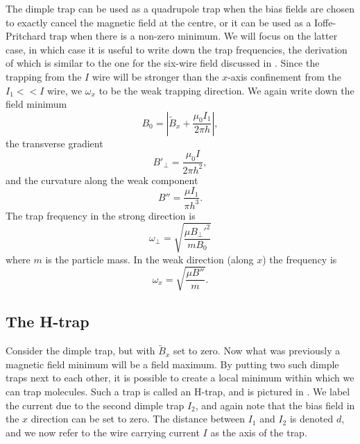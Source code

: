 The dimple trap can be used as a quadrupole trap when the bias fields are
chosen to exactly cancel the magnetic field at the centre, or it can be used as
a Ioffe-Pritchard trap when there is a non-zero minimum. We will focus on the
latter case, in which case it is useful to write down the trap frequencies, the
derivation of which is similar to the one for the six-wire field discussed in
.
Since the trapping from the $I$ wire will be stronger than the $x$-axis
confinement from the $I_1 << I$ wire, we $\omega_x$ to be the weak trapping
direction. We again write down the field minimum
%
\begin{equation}
  B_0 = \left|\tilde{B}_x + \frac{\mu_0 I_1}{2\pi h}\right|,
\end{equation}
%
the transverse gradient
%
\begin{equation}
  B'_\perp = \frac{\mu_0 I}{2 \pi h^2},
\end{equation}
%
and the curvature along the weak component
%
\begin{equation}
  B'' = \frac{\mu I_1}{\pi h^3}.
\end{equation}
%
The trap frequency in the strong direction is
%
\begin{equation}
  \omega_\perp = \sqrt{\frac{\mu B_\perp'^2}{m B_0}}
  \label{theory:eqn:perpfreq}
\end{equation}
%
where $m$ is the particle mass. In the weak direction (along $x$) the frequency
is
%
\begin{equation}
  \omega_x = \sqrt{\frac{\mu B''}{m}}.
  \label{theory:eqn:xfreq}
\end{equation}

\subsection{The H-trap}

Consider the dimple trap, but with $\tilde{B}_x$ set to zero. Now what was
previously a magnetic field minimum will be a field maximum. By putting two
such dimple traps next to each other, it is possible to create a local minimum
within which we can trap molecules. Such a trap is called an H-trap, and is
pictured in . We label the current due to the second
dimple trap $I_2$, and again note that the bias field in the $x$ direction can
be set to zero. The distance between $I_1$ and $I_2$ is denoted $d$, and we now
refer to the wire carrying current $I$ as the axis of the trap.

